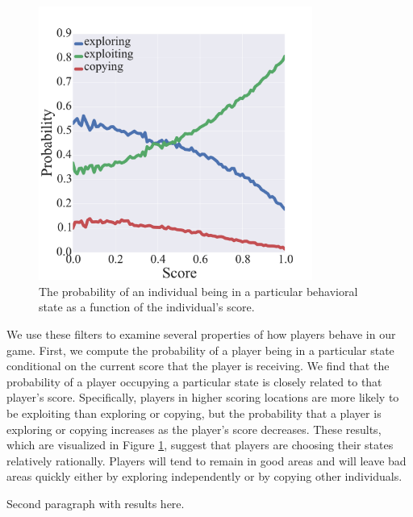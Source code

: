 \documentclass[12pt,letterpaper]{article}
\begin{document}
\begin{figure}[t!]
  \centering
  \includegraphics[width=0.8\textwidth]{./figures/states}
  \caption{The probability of an individual being in a particular
    behavioral state as a function of the individual's score.}
  \label{fig:states}
\end{figure}

We use these filters to examine several properties of how players behave in our game.
First, we compute the probability of a player being in a particular state conditional on the current score that the player is receiving.
We find that the probability of a player occupying a particular state is closely related to that player's score.  
Specifically, players in higher scoring locations are more likely to be exploiting than exploring or copying, but the probability that a player is exploring or copying increases as the player's score decreases.  
These results, which are visualized in Figure \ref{fig:states}, suggest that players are choosing their states relatively rationally.  
Players will tend to remain in good areas and will leave bad areas quickly either by exploring independently or by copying other individuals.

Second paragraph with results here.
\end{document}
